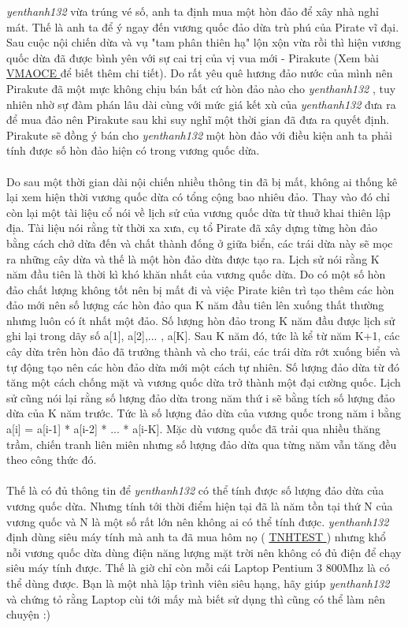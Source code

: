 

\emph{yenthanh132 } vừa trúng vé số, anh ta định mua một hòn đảo để xây nhà nghỉ mát. Thế là anh ta để ý ngay đến vương quốc đảo dừa trù phú của Pirate vĩ đại. Sau cuộc nội chiến dừa và vụ "tam phân thiên hạ" lộn xộn vừa rồi thì hiện vương quốc dừa đã được bình yên với sự cai trị của vị vua mới - Pirakute (Xem bài \href{../../VMAOCE/}{ VMAOCE } để biết thêm chi tiết). Do rất yêu quê hương đảo nước của mình nên Pirakute đã một mực không chịu bán bất cứ hòn đảo nào cho \emph{ yenthanh132 } , tuy nhiên nhờ sự đàm phán lâu dài cùng với mức giá kết xù của \emph{ yenthanh132 } đưa ra để mua đảo nên Pirakute sau khi suy nghĩ một thời gian đã đưa ra quyết định. Pirakute sẽ đồng ý bán cho \emph{ yenthanh132 } một hòn đảo với điều kiện anh ta phải tính được số hòn đảo hiện có trong vương quốc dừa.
\\
\\Do sau một thời gian dài nội chiến nhiều thông tin đã bị mất, không ai thống kê lại xem hiện thời vương quốc dừa có tổng cộng bao nhiêu đảo. Thay vào đó chỉ còn lại một tài liệu cổ nói về lịch sử của vương quốc dừa từ thuở khai thiên lập địa. Tài liệu nói rằng từ thời xa xưa, cụ tổ Pirate đã xây dựng từng hòn đảo bằng cách chở dừa đến và chất thành đống ở giữa biển, các trái dừa này sẽ mọc ra những cây dừa và thế là một hòn đảo dừa được tạo ra. Lịch sử nói rằng K năm đầu tiên là thời kì khó khăn nhất của vương quốc dừa. Do có một số hòn đảo chất lượng không tốt nên bị mất đi và việc Pirate kiên trì tạo thêm các hòn đảo mới nên số lượng các hòn đảo qua K năm đầu tiên lên xuống thất thường nhưng luôn có ít nhất một đảo. Số lượng hòn đảo trong K năm đầu được lịch sử ghi lại trong dãy số a[1], a[2],... , a[K]. Sau K năm đó, tức là kể từ năm K+1, các cây dừa trên hòn đảo đã trưởng thành và cho trái, các trái dừa rớt xuống biển và tự động tạo nên các hòn đảo dừa mới một cách tự nhiên. Số lượng đảo dừa từ đó tăng một cách chống mặt và vương quốc dừa trở thành một đại cường quốc. Lịch sử cũng nói lại rằng số lượng đảo dừa trong năm thứ i sẽ bằng tích số lượng đảo dừa của K năm trước. Tức là số lượng đảo dừa của vương quốc trong năm i bằng a[i] = a[i-1] * a[i-2] * ... * a[i-K]. Mặc dù vương quốc đã trải qua nhiều thăng trầm, chiến tranh liên miên nhưng số lượng đảo dừa qua từng năm vẫn tăng đều theo công thức đó.
\\
\\Thế là có đủ thông tin để \emph{ yenthanh132 } có thể tính được số lượng đảo dừa của vương quốc dừa. Nhưng tính tới thời điểm hiện tại đã là năm tồn tại thứ N của vương quốc và N là một số rất lớn nên không ai có thể tính được. \emph{ yenthanh132 } định dùng siêu máy tính mà anh ta đã mua hôm nọ ( \href{../../TNHTEST/}{ TNHTEST } ) nhưng khổ nỗi vương quốc dừa dùng điện năng lượng mặt trời nên không có đủ điện để chạy siêu máy tính được. Thế là giờ chỉ còn mỗi cái Laptop Pentium 3 800Mhz là có thể dùng được. Bạn là một nhà lập trình viên siêu hạng, hãy giúp \emph{ yenthanh132 } và chứng tỏ rằng Laptop cùi tới mấy mà biết sử dụng thì cũng có thể làm nên chuyện :)

